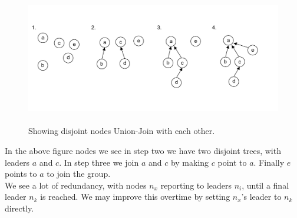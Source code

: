 \vspace{-3.5em}
\begin{figure}[h]
    \centering
    \includegraphics[height=2.3in]{./Sections/spanning/forest-diag.png}
    
    \vspace{-2em}
    \caption{Showing disjoint nodes Union-Join with each other.}
    \label{fig:forest_diag}
\end{figure}

\noindent
In the above figure nodes we see in step two we have two disjoint trees, with leaders $a$ and $c$. In step three we join $a$ and $c$ by making $c$ point to $a$. Finally $e$ points to $a$ to join the group.\\

\noindent
We see a lot of redundancy, with nodes $n_x$ reporting to leaders $n_i$, until a final leader $n_k$ is reached. We may improve this overtime by setting $n_x$'s leader to $n_k$ directly.\\

